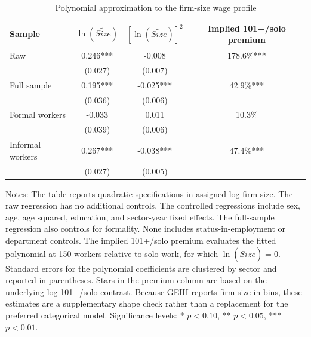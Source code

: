 \begin{table}[htbp]
  \centering
  \caption{Polynomial approximation to the firm-size wage profile}
  \label{tab:polynomial-size-profile}
  \small
  \begin{tabular}{lccc}
    \toprule
    Sample & $\ln(\widetilde{Size})$ & $[\ln(\widetilde{Size})]^2$ & Implied 101+/solo premium \\
    \midrule
    Raw & 0.246*** & -0.008 & 178.6\%*** \\
     & (0.027) & (0.007) &  \\
    Full sample & 0.195*** & -0.025*** & 42.9\%*** \\
     & (0.036) & (0.006) &  \\
    Formal workers & -0.033 & 0.011 & 10.3\% \\
     & (0.039) & (0.006) &  \\
    Informal workers & 0.267*** & -0.038*** & 47.4\%*** \\
     & (0.027) & (0.005) &  \\
    \bottomrule
  \end{tabular}
  \vspace{0.3em}
  \begin{minipage}{0.95\textwidth}
  \footnotesize
  Notes: The table reports quadratic specifications in assigned log firm size. The raw regression has no additional controls. The controlled regressions include sex, age, age squared, education, and sector-year fixed effects. The full-sample regression also controls for formality. None includes status-in-employment or department controls. The implied 101+/solo premium evaluates the fitted polynomial at 150 workers relative to solo work, for which $\ln(\widetilde{Size})=0$. Standard errors for the polynomial coefficients are clustered by sector and reported in parentheses. Stars in the premium column are based on the underlying log 101+/solo contrast. Because GEIH reports firm size in bins, these estimates are a supplementary shape check rather than a replacement for the preferred categorical model. Significance levels: * $p<0.10$, ** $p<0.05$, *** $p<0.01$.
  \end{minipage}
\end{table}
